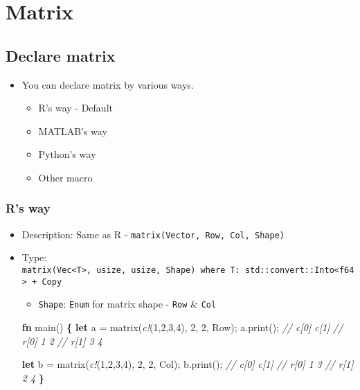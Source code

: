 \documentclass[]{book}
\newenvironment{Shaded}{\begin{snugshade}}{\end{snugshade}}
\newcommand{\CommentTok}[1]{\textcolor[rgb]{0.56,0.35,0.01}{\textit{#1}}}
\newcommand{\DecValTok}[1]{\textcolor[rgb]{0.00,0.00,0.81}{#1}}
\newcommand{\KeywordTok}[1]{\textcolor[rgb]{0.13,0.29,0.53}{\textbf{#1}}}
\newcommand{\NormalTok}[1]{#1}
\newcommand{\OperatorTok}[1]{\textcolor[rgb]{0.81,0.36,0.00}{\textbf{#1}}}
\newcommand{\PreprocessorTok}[1]{\textcolor[rgb]{0.56,0.35,0.01}{\textit{#1}}}
\providecommand{\tightlist}{%
  \setlength{\itemsep}{0pt}\setlength{\parskip}{0pt}}
\begin{document}
\hypertarget{matrix}{%
\chapter{Matrix}\label{matrix}}

\hypertarget{declare-matrix}{%
\section{Declare matrix}\label{declare-matrix}}

\begin{itemize}
\tightlist
\item
  You can declare matrix by various ways.

  \begin{itemize}
  \tightlist
  \item
    R's way - Default
  \item
    MATLAB's way
  \item
    Python's way
  \item
    Other macro
  \end{itemize}
\end{itemize}

\hypertarget{rs-way}{%
\subsection{R's way}\label{rs-way}}

\begin{itemize}
\tightlist
\item
  Description: Same as R - \texttt{matrix(Vector,\ Row,\ Col,\ Shape)}
\item
  Type: \texttt{matrix(Vec\textless{}T\textgreater{},\ usize,\ usize,\ Shape)\ where\ T:\ std::convert::Into\textless{}f64\textgreater{}\ +\ Copy}

  \begin{itemize}
  \tightlist
  \item
    \texttt{Shape}: \texttt{Enum} for matrix shape - \texttt{Row} \& \texttt{Col}
  \end{itemize}

\begin{Shaded}
\begin{Highlighting}[]
\KeywordTok{fn}\NormalTok{ main() }\OperatorTok{\{}
    \KeywordTok{let}\NormalTok{ a = matrix(}\PreprocessorTok{c!}\NormalTok{(}\DecValTok{1}\NormalTok{,}\DecValTok{2}\NormalTok{,}\DecValTok{3}\NormalTok{,}\DecValTok{4}\NormalTok{), }\DecValTok{2}\NormalTok{, }\DecValTok{2}\NormalTok{, Row);}
\NormalTok{    a.print();}
    \CommentTok{//       c[0] c[1]}
    \CommentTok{// r[0]     1    2}
    \CommentTok{// r[1]     3    4}

    \KeywordTok{let}\NormalTok{ b = matrix(}\PreprocessorTok{c!}\NormalTok{(}\DecValTok{1}\NormalTok{,}\DecValTok{2}\NormalTok{,}\DecValTok{3}\NormalTok{,}\DecValTok{4}\NormalTok{), }\DecValTok{2}\NormalTok{, }\DecValTok{2}\NormalTok{, Col);}
\NormalTok{    b.print();}
    \CommentTok{//       c[0] c[1]}
    \CommentTok{// r[0]     1    3}
    \CommentTok{// r[1]     2    4}
\OperatorTok{\}}
\end{Highlighting}
\end{Shaded}
\end{itemize}
\end{document}
